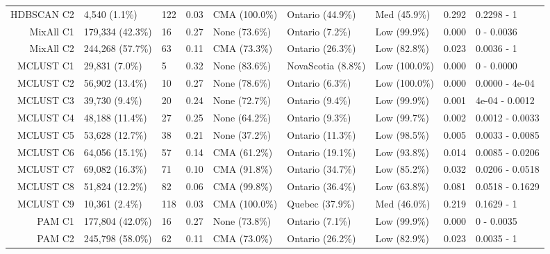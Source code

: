 \documentclass[11pt, a4paper]{article}
\begin{document}
\begin{table}[H]
{\begin{tabular}{|r|llllllll|}
\rowcolor{gray!25}  HDBSCAN C2 & 4,540 (1.1\%) & 122 & 0.03 & CMA (100.0\%) & Ontario (44.9\%) & Med (45.9\%) & 0.292 & 0.2298 - 1 \\
  MixAll C1 & 179,334 (42.3\%) & 16 & 0.27 & None (73.6\%) & Ontario (7.2\%) & Low (99.9\%) & 0.000 & 0 - 0.0036 \\
  MixAll C2 & 244,268 (57.7\%) & 63 & 0.11 & CMA (73.3\%) & Ontario (26.3\%) & Low (82.8\%) & 0.023 & 0.0036 - 1 \\
\rowcolor{gray!25}  MCLUST C1 & 29,831 (7.0\%) & 5 & 0.32 & None (83.6\%) & NovaScotia (8.8\%) & Low (100.0\%) & 0.000 & 0 - 0.0000 \\
\rowcolor{gray!25}  MCLUST C2 & 56,902 (13.4\%) & 10 & 0.27 & None (78.6\%) & Ontario (6.3\%) & Low (100.0\%) & 0.000 & 0.0000 - 4e-04 \\
 \rowcolor{gray!25} MCLUST C3 & 39,730 (9.4\%) & 20 & 0.24 & None (72.7\%) & Ontario (9.4\%) & Low (99.9\%) & 0.001 & 4e-04 - 0.0012 \\
 \rowcolor{gray!25} MCLUST C4 & 48,188 (11.4\%) & 27 & 0.25 & None (64.2\%) & Ontario (9.3\%) & Low (99.7\%) & 0.002 & 0.0012 - 0.0033 \\
 \rowcolor{gray!25} MCLUST C5 & 53,628 (12.7\%) & 38 & 0.21 & None (37.2\%) & Ontario (11.3\%) & Low (98.5\%) & 0.005 & 0.0033 - 0.0085 \\
\rowcolor{gray!25}  MCLUST C6 & 64,056 (15.1\%) & 57 & 0.14 & CMA (61.2\%) & Ontario (19.1\%) & Low (93.8\%) & 0.014 & 0.0085 - 0.0206 \\
 \rowcolor{gray!25} MCLUST C7 & 69,082 (16.3\%) & 71 & 0.10 & CMA (91.8\%) & Ontario (34.7\%) & Low (85.2\%) & 0.032 & 0.0206 - 0.0518 \\
\rowcolor{gray!25}  MCLUST C8 & 51,824 (12.2\%) & 82 & 0.06 & CMA (99.8\%) & Ontario (36.4\%) & Low (63.8\%) & 0.081 & 0.0518 - 0.1629 \\
 \rowcolor{gray!25} MCLUST C9 & 10,361 (2.4\%) & 118 & 0.03 & CMA (100.0\%) & Quebec (37.9\%) & Med (46.0\%) & 0.219 & 0.1629 - 1 \\
  PAM C1 & 177,804 (42.0\%) & 16 & 0.27 & None (73.8\%) & Ontario (7.1\%) & Low (99.9\%) & 0.000 & 0 - 0.0035 \\
  PAM C2 & 245,798 (58.0\%) & 62 & 0.11 & CMA (73.0\%) & Ontario (26.2\%) & Low (82.9\%) & 0.023 & 0.0035 - 1 \\
   \hline
\end{tabular}
}
\end{table}
\end{document}
